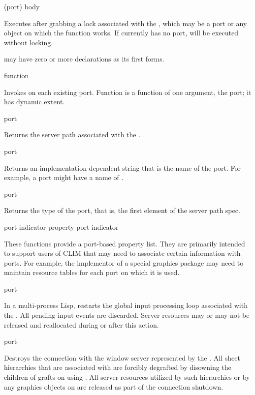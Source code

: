  {(port) \body body} 

Executes  after grabbing a lock associated with the 
, which may be a port or any object on which the function 
works.  If  currently has no port,  will be executed
without locking.

 may have zero or more declarations as its first forms.


 {function}

Invokes  on each existing port.  Function is a function of one
argument, the port; it has dynamic extent.

 {port}

Returns the server path associated with the  .

 {port}

Returns an implementation-dependent string that is the name of the port.  For
example, a  port might have a name of .

 {port}

Returns the type of the port, that is, the first element of the server path
spec.


 {port indicator}
 {property port indicator}

These functions provide a port-based property list.  They are primarily intended
to support users of CLIM that may need to associate certain information with
ports.  For example, the implementor of a special graphics package may need to
maintain resource tables for each port on which it is used.

 {port}

In a multi-process Lisp,  restarts the global input processing
loop associated with the  .  All pending input events are
discarded.  Server resources may or may not be released and reallocated during
or after this action.

 {port}

Destroys the connection with the window server represented by the 
.  All sheet hierarchies that are associated with  are
forcibly degrafted by disowning the children of grafts on  using
.  All server resources utilized by such hierarchies or
by any graphics objects on  are released as part of the connection
shutdown.


